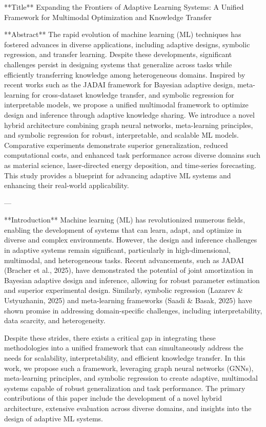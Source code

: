 **Title**  
Expanding the Frontiers of Adaptive Learning Systems: A Unified Framework for Multimodal Optimization and Knowledge Transfer  

**Abstract**  
The rapid evolution of machine learning (ML) techniques has fostered advances in diverse applications, including adaptive designs, symbolic regression, and transfer learning. Despite these developments, significant challenges persist in designing systems that generalize across tasks while efficiently transferring knowledge among heterogeneous domains. Inspired by recent works such as the JADAI framework for Bayesian adaptive design, meta-learning for cross-dataset knowledge transfer, and symbolic regression for interpretable models, we propose a unified multimodal framework to optimize design and inference through adaptive knowledge sharing. We introduce a novel hybrid architecture combining graph neural networks, meta-learning principles, and symbolic regression for robust, interpretable, and scalable ML models. Comparative experiments demonstrate superior generalization, reduced computational costs, and enhanced task performance across diverse domains such as material science, laser-directed energy deposition, and time-series forecasting. This study provides a blueprint for advancing adaptive ML systems and enhancing their real-world applicability.  

---

**Introduction**  
Machine learning (ML) has revolutionized numerous fields, enabling the development of systems that can learn, adapt, and optimize in diverse and complex environments. However, the design and inference challenges in adaptive systems remain significant, particularly in high-dimensional, multimodal, and heterogeneous tasks. Recent advancements, such as JADAI (Bracher et al., 2025), have demonstrated the potential of joint amortization in Bayesian adaptive design and inference, allowing for robust parameter estimation and superior experimental design. Similarly, symbolic regression (Lazarev & Ustyuzhanin, 2025) and meta-learning frameworks (Saadi & Basak, 2025) have shown promise in addressing domain-specific challenges, including interpretability, data scarcity, and heterogeneity.  

Despite these strides, there exists a critical gap in integrating these methodologies into a unified framework that can simultaneously address the needs for scalability, interpretability, and efficient knowledge transfer. In this work, we propose such a framework, leveraging graph neural networks (GNNs), meta-learning principles, and symbolic regression to create adaptive, multimodal systems capable of robust generalization and task performance. The primary contributions of this paper include the development of a novel hybrid architecture, extensive evaluation across diverse domains, and insights into the design of adaptive ML systems.  

